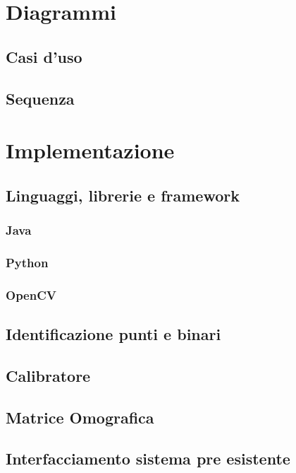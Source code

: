 \documentclass[twoside]{supsistudent}
\begin{document}
\chapter{Diagrammi}

\section{Casi d'uso}

\section{Sequenza}

\chapter{Implementazione}

\section{Linguaggi, librerie e framework}
\subsection{Java}
\subsection{Python}
\subsection{OpenCV}

\section{Identificazione punti e binari}

\section{Calibratore}

\section{Matrice Omografica}

\section{Interfacciamento sistema pre esistente}
\end{document}
